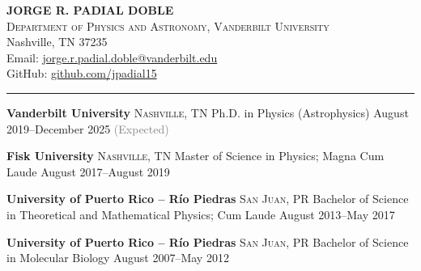 \documentclass[11pt,a4paper]{article}
\begin{document}
\begin{center}
    {\Huge\textbf{JORGE R. PADIAL DOBLE}}\\[0.4cm]
    {\large\textsc{Department of Physics and Astronomy, Vanderbilt University}}\\
    {\normalsize Nashville, TN 37235}\\[0.3cm]
    {\small
    Email: \href{mailto:jorge.r.padial.doble@vanderbilt.edu}{jorge.r.padial.doble@vanderbilt.edu}\\
    GitHub: \href{https://github.com/jpadial15}{github.com/jpadial15}
    }\\[0.2cm]
    \rule{0.7\textwidth}{0.4pt}
\end{center}

\spacedhrule{0.5em}{-0.4em}



\headedsection
{\textbf{Vanderbilt University}}
{\textsc{Nashville, TN}}
{%
    \headedsubsection
    {Ph.D. in Physics (Astrophysics)}
    {August 2019–December 2025 {\small\textcolor{gray}{(Expected)}}}
    {}
}

\headedsection
{\textbf{Fisk University}}
{\textsc{Nashville, TN}}
{%
    \headedsubsection
    {Master of Science in Physics; Magna Cum Laude}
    {August 2017–August 2019}
    {}
}

\headedsection
{\textbf{University of Puerto Rico -- Río Piedras}}
{\textsc{San Juan, PR}}
{%
    \headedsubsection
    {Bachelor of Science in Theoretical and Mathematical Physics; Cum Laude}
    {August 2013–May 2017}
    {}
}

\headedsection
{\textbf{University of Puerto Rico -- Río Piedras}}
{\textsc{San Juan, PR}}
{%
    \headedsubsection
    {Bachelor of Science in Molecular Biology}
    {August 2007–May 2012}
    {}
}
\end{document}
